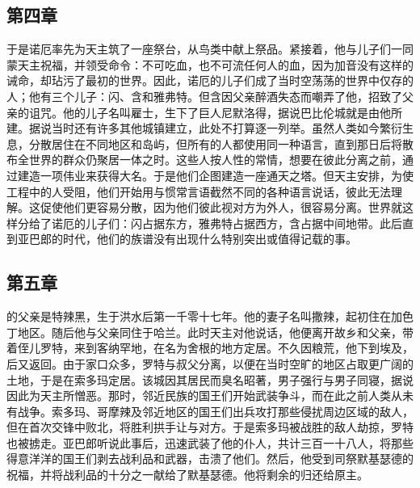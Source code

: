 
\subsection{第四章}

于是诺厄率先为天主筑了一座祭台，从鸟类中献上祭品。紧接着，他与儿子们一同蒙天主祝福，并领受命令：不可吃血，也不可流任何人的血，因为加音没有这样的诫命，却玷污了最初的世界。因此，诺厄的儿子们成了当时空荡荡的世界中仅存的人；他有三个儿子：闪、含和雅弗特。但含因父亲醉酒失态而嘲弄了他，招致了父亲的诅咒。他的儿子名叫雇士，生下了巨人尼默洛得，据说巴比伦城就是由他所建。据说当时还有许多其他城镇建立，此处不打算逐一列举。虽然人类如今繁衍生息，分散居住在不同地区和岛屿，但所有的人都使用同一种语言，直到那日后将散布全世界的群众仍聚居一体之时。这些人按人性的常情，想要在彼此分离之前，通过建造一项伟业来获得大名。于是他们企图建造一座通天之塔。但天主安排，为使工程中的人受阻，他们开始用与惯常言语截然不同的各种语言说话，彼此无法理解。这促使他们更容易分散，因为他们彼此视对方为外人，很容易分离。世界就这样分给了诺厄的儿子们：闪占据东方，雅弗特占据西方，含占据中间地带。此后直到亚巴郎的时代，他们的族谱没有出现什么特别突出或值得记载的事。\par


\subsection{第五章}

的父亲是特辣黑，生于洪水后第一千零十七年。他的妻子名叫撒辣，起初住在加色丁地区。随后他与父亲同住于哈兰。此时天主对他说话，他便离开故乡和父亲，带着侄儿罗特，来到客纳罕地，在名为舍根的地方定居。不久因粮荒，他下到埃及，后又返回。由于家口众多，罗特与叔父分离，以便在当时空旷的地区占取更广阔的土地，于是在索多玛定居。该城因其居民而臭名昭著，男子强行与男子同寝，据说因此为天主所憎恶。那时，邻近民族的国王们开始武装争斗，而在此之前人类从未有战争。索多玛、哥摩辣及邻近地区的国王们出兵攻打那些侵扰周边区域的敌人，但在首次交锋中败北，将胜利拱手让与对方。于是索多玛被战胜的敌人劫掠，罗特也被掳走。亚巴郎听说此事后，迅速武装了他的仆人，共计三百一十八人，将那些得意洋洋的国王们剥去战利品和武器，击溃了他们。然后，他受到司祭默基瑟德的祝福，并将战利品的十分之一献给了默基瑟德。他将剩余的归还给原主。\par


